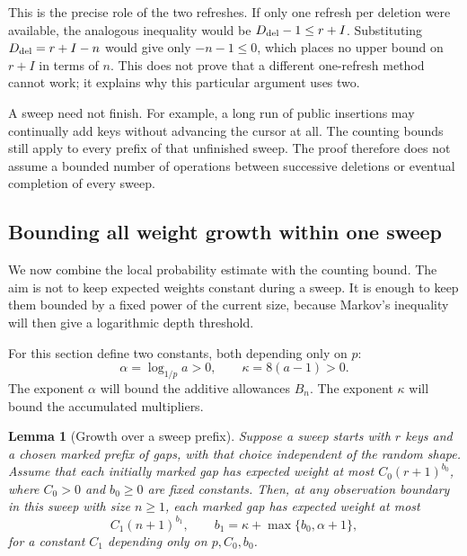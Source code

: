 \documentclass[11pt,a4paper]{article}
\theoremstyle{readable}
\newtheorem{lemma}[theorem]{Lemma}
\begin{document}
This is the precise role of the two refreshes. If only one refresh
per deletion were available, the analogous inequality would be
$D_{\rm del}-1\le r+I$. Substituting
$D_{\rm del}=r+I-n$ would give only $-n-1\le0$, which places no
upper bound on $r+I$ in terms of $n$. This does not prove that a
different one-refresh method cannot work; it explains why this
particular argument uses two.

A sweep need not finish. For example, a long run of public insertions
may continually add keys without advancing the cursor at all. The
counting bounds still apply to every prefix of that unfinished sweep.
The proof therefore does not assume a bounded number of operations
between successive deletions or eventual completion of every sweep.

\subsection{Bounding all weight growth within one sweep}
\label{sec:growth}

We now combine the local probability estimate with the counting bound.
The aim is not to keep expected weights constant during a sweep.
It is enough to keep them bounded by a fixed power of the current size,
because Markov's inequality will then give a logarithmic depth threshold.

For this section define two constants, both depending only on $p$:
\[
  \alpha=\log_{1/p}a>0,
  \qquad \kappa=8(a-1)>0.
\]
The exponent $\alpha$ will bound the additive allowances $B_n$.
The exponent $\kappa$ will bound the accumulated multipliers.

\begin{lemma}[Growth over a sweep prefix]
\label{lem:growth}
Suppose a sweep starts with $r$ keys and a chosen marked prefix of
gaps, with that choice independent of the random shape. Assume that
each initially marked gap has expected weight at most
$C_0(r+1)^{b_0}$, where $C_0>0$ and $b_0\ge0$ are fixed constants.
Then, at any observation boundary in this sweep with size $n\ge1$,
each marked gap has expected weight at most
\[
  C_1(n+1)^{b_1},\qquad
  b_1=\kappa+\max\{b_0,\alpha+1\},
\]
for a constant $C_1$ depending only on $p,C_0,b_0$.
\end{lemma}
\end{document}
